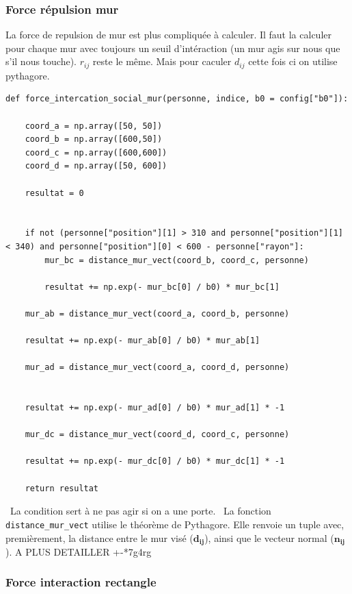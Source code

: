 \documentclass[a4paper,12pt]{article}
\begin{document}
\subsubsection{Force répulsion mur}
La force de repulsion de mur est plus compliquée à calculer. Il faut la calculer pour chaque mur avec toujours un seuil d'intéraction (un mur agis sur nous que s'il nous touche). \textbf{$r_{ij}$} reste le même. Mais pour caculer \textbf{$d_{ij}$} cette fois ci on utilise pythagore.

\begin{verbatim}
def force_intercation_social_mur(personne, indice, b0 = config["b0"]):

    coord_a = np.array([50, 50])
    coord_b = np.array([600,50])
    coord_c = np.array([600,600])
    coord_d = np.array([50, 600])
    
    resultat = 0
    
    
    if not (personne["position"][1] > 310 and personne["position"][1] < 340) and personne["position"][0] < 600 - personne["rayon"]:
        mur_bc = distance_mur_vect(coord_b, coord_c, personne)
    
        resultat += np.exp(- mur_bc[0] / b0) * mur_bc[1]

    mur_ab = distance_mur_vect(coord_a, coord_b, personne)
    
    resultat += np.exp(- mur_ab[0] / b0) * mur_ab[1]

    mur_ad = distance_mur_vect(coord_a, coord_d, personne)

    
    resultat += np.exp(- mur_ad[0] / b0) * mur_ad[1] * -1

    mur_dc = distance_mur_vect(coord_d, coord_c, personne)

    resultat += np.exp(- mur_dc[0] / b0) * mur_dc[1] * -1

    return resultat
\end{verbatim}

\
La condition sert à ne pas agir si on a une porte.
\
La fonction \texttt{distance\_mur\_vect} utilise le théorème de Pythagore. Elle renvoie un tuple avec, premièrement, la distance entre le mur visé ($\mathbf{d_{ij}}$), ainsi que le vecteur normal ($\mathbf{n_{ij}}$). A PLUS DETAILLER +-*7g4rg


\subsubsection{Force interaction rectangle}
\end{document}
